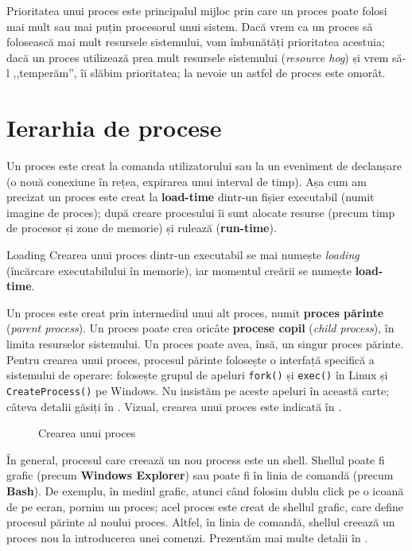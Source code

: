 Prioritatea unui proces este principalul mijloc prin care un proces poate folosi mai mult sau mai puțin procesorul unui sistem.
Dacă vrem ca un proces să folosească mai mult resursele sistemului, vom îmbunătăți prioritatea acestuia;
dacă un proces utilizează prea mult resursele sistemului (\textit{resource hog}) și vrem să-l ,,temperăm'', îi slăbim prioritatea;
la nevoie un astfel de proces este omorât.

\section{Ierarhia de procese}
\label{sec:process:hierarhy}

Un proces este creat la comanda utilizatorului sau la un eveniment de declanșare (o nouă conexiune în rețea, expirarea unui interval de timp).
Așa cum am precizat un proces este creat la \textbf{load-time} dintr-un fișier executabil (numit imagine de proces);
după creare procesului îi sunt alocate resurse (precum timp de procesor și zone de memorie) și rulează (\textbf{run-time}).

\begin{definition}{Loading}
  Crearea unui proces dintr-un executabil se mai numește \textit{loading} (încărcare executabilului în memorie), iar momentul creării se numește \textbf{load-time}.
\end{definition}

Un proces este creat prin intermediul unui alt proces, numit \textbf{proces părinte} (\textit{parent process}).
Un proces poate crea oricâte \textbf{procese copil} (\textit{child process}), în limita resurselor sistemului.
Un proces poate avea, însă, un singur proces părinte.
Pentru crearea unui proces, procesul părinte folosește o interfață specifică a sistemului de operare: folosește grupul de apeluri \texttt{fork()} și \texttt{exec()} în Linux și \texttt{CreateProcess()} pe Windows.
Nu insistăm pe aceste apeluri în această carte;
câteva detalii găsiți în .
Vizual, crearea unui proces este indicată în .

\begin{figure}[!htbp]
  \centering
  \def\svgwidth{0.5\textwidth}
  
  \caption{Crearea unui proces}
  \label{fig:process:create}
\end{figure}

În general, procesul care creează un nou process este un shell.
Shellul poate fi grafic (precum \textbf{Windows Explorer}) sau poate fi în linia de comandă (precum \textbf{Bash}).
De exemplu, în mediul grafic, atunci când folosim dublu click pe o icoană de pe ecran, pornim un proces;
acel proces este creat de shellul grafic, care define procesul părinte al noului proces.
Altfel, în linia de comandă, shellul creează un proces nou la introducerea unei comenzi.
Prezentăm mai multe detalii în .

